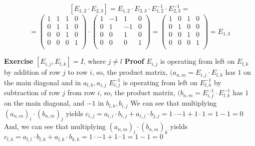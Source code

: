\documentclass[12pt]{article}
\begin{document}
$$  [E_{1,2} \cdot E_{2,3}]=E_{1,2} \cdot E_{2,3} \cdot E_{1,2}^{-1} \cdot E_{2,3}^{-1}=$$
$$=\begin{pmatrix} 
	1 & 1 & 1 & 0 \\
	0 & 1 & 1 & 0 \\
	0 & 0 & 1 & 0 \\
	0 & 0 & 0 & 1 \\
	\end{pmatrix} \cdot \begin{pmatrix} 
	1 & -1 & 1 & 0 \\
	0 & 1 & -1 & 0 \\
	0 & 0 & 1 & 0 \\
	0 & 0 & 0 & 1 \\
	\end{pmatrix}=\begin{pmatrix} 
	1 & 0 & 1 & 0 \\
	0 & 1 & 0 & 0 \\
	0 & 0 & 1 & 0 \\
	0 & 0 & 0 & 1 \\
\end{pmatrix}=E_{1,3}$$

\textbf{Exercise}
\( [E_{i,j},E_{l,k}]=I \), where \( j \neq l \) \newline
\textbf{Proof}
\( E_{i,j} \) is operating from left on \( E_{l,k} \) by addition of row \( j \) to row \( i \),
so, the product matrix, \( (a_{n,m}=E_{i,j} \cdot E_{l,k} \) has \( 1 \) on the main diagonal and in \( a_{l,k},a_{i,j} \) \newline
\( E_{i,j}^{-1} \) is operating from left on \( E_{l,k}^{-1} \) by subtraction of row \( j \) from row \( i \),
so, the product matrix, \( (b_{n,m}=E_{i,j}^{-1} \cdot E_{l,k}^{-1} \) has \( 1 \) on the main diagonal, \newline
and \( -1 \) in \( b_{l,k},b_{i,j} \) \newline
We can see that multiplying \( (a_{n,m})_{i} \cdot (b_{n,m})_{j} \)
yields \( c_{i,j}=a_{i,i} \cdot b_{i,j}+a_{i,j} \cdot b_{j,j}=1 \cdot -1+1 \cdot 1=1-1=0 \) \newline
And, we can see that multiplying \( (a_{n,m})_{l} \cdot (b_{n,m})_{k} \)
yields \( c_{l,k}=a_{l,l} \cdot b_{l,k}+a_{l,k} \cdot b_{k,k}=1 \cdot -1+1 \cdot 1=1-1=0 \)
\end{document}
